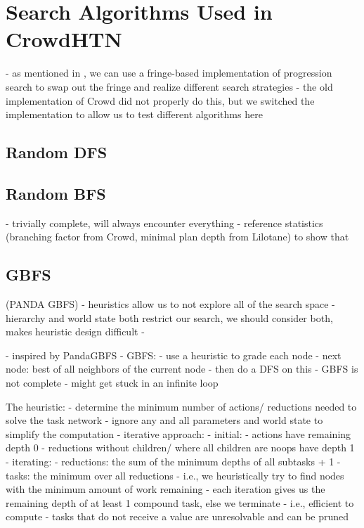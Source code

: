 \section{Search Algorithms Used in CrowdHTN}
- as mentioned in \cite{holler2020htn}, we can use a fringe-based implementation of progression search to swap out the fringe and realize different search strategies
- the old implementation of Crowd did not properly do this, but we switched the implementation to allow us to test different algorithms here

\subsection{Random DFS}


\subsection{Random BFS}
- trivially complete, will always encounter everything
- reference statistics (branching factor from Crowd, minimal plan depth from Lilotane) to show that 

\subsection{GBFS}
\cite{holler2020htn} (PANDA GBFS)
	- heuristics allow us to not explore all of the search space
	- hierarchy and world state both restrict our search, we should consider both, makes heuristic design difficult
	- 

- inspired by PandaGBFS
- GBFS:
	- use a heuristic to grade each node
	- next node: best of all neighbors of the current node
	- then do a DFS on this
- GBFS is not complete
- might get stuck in an infinite loop

The heuristic:
- determine the minimum number of actions/ reductions needed to solve the task network
- ignore any and all parameters and world state to simplify the computation
- iterative approach:
	- initial:
		- actions have remaining depth 0
		- reductions without children/ where all children are noops have depth 1
	- iterating:
		- reductions: the sum of the minimum depths of all subtasks + 1
		- tasks: the minimum over all reductions
- i.e., we heuristically try to find nodes with the minimum amount of work remaining
- each iteration gives us the remaining depth of at least 1 compound task, else we terminate
- i.e., efficient to compute
- tasks that do not receive a value are unresolvable and can be pruned

